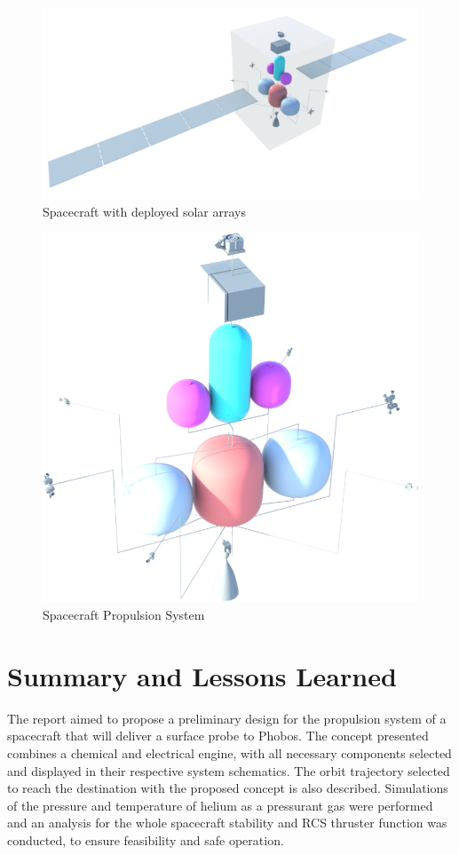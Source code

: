 \documentclass[conference]{IEEEtran}
\begin{document}
\begin{figure}[H]
  \centering
  \includegraphics[width=\linewidth]{img/Rendering.PNG}
  \caption{Spacecraft with deployed solar arrays}
  \label{fig:rendering}
\end{figure}

\begin{figure}[H]
  \centering
  \includegraphics[width=\linewidth]{img/PROP.PNG}
  \caption{Spacecraft Propulsion System}
  \label{fig:prop}
\end{figure}



\section{Summary and Lessons Learned}
The report aimed to propose a preliminary design for the propulsion system of a spacecraft that will deliver a surface probe to Phobos. The concept presented combines a chemical and electrical engine, with all necessary components selected and displayed in their respective system schematics. The orbit trajectory selected to reach the destination with the proposed concept is also described. Simulations of the pressure and temperature of helium as a pressurant gas were performed and an analysis for the whole spacecraft stability and RCS thruster function was conducted, to ensure feasibility and safe operation.
\end{document}
